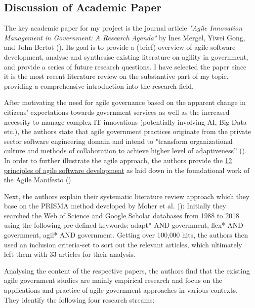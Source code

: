 \documentclass[a4paper]{article}
\begin{document}
\begin{spacing}{1.5}
\subsection*{Discussion of Academic Paper}
The key academic paper for my project is the journal article \textit{"Agile Innovation Management in Government: A Research Agenda"} by Ines Mergel, Yiwei Gong, and John Bertot (\cite*{Mergel2018}). Its goal is to provide a (brief) overview of agile software development, analyse and synthesise existing literature on agility in government, and provide a series of future research questions. I have selected the paper since it is the most recent literature review on the substantive part of my topic, providing a comprehensive introduction into the research field.\par 
After motivating the need for agile governance based on the apparent change in citizens' expectations towards government services as well as the increased necessity to manage complex IT innovations (potentially involving AI, Big Data etc.), the authors state that agile government practices originate from the private sector software engineering domain and intend to "transform organizational culture and methods of collaboration to achieve higher level of adaptiveness” (\cite[p. 292]{Mergel2018}). In order to further illustrate the agile approach, the authors provide the \href{https://agilemanifesto.org/principles.html}{12 principles of agile software development} as laid down in the foundational work of the Agile Manifesto (\cite*{AgileManifesto2001}).\par 
Next, the authors explain their systematic literature review approach which they base on the PRISMA method developed by Moher et al. (\cite*{Moher2009}): Initially they searched the Web of Science and Google Scholar databases from 1988 to 2018 using the following pre-defined keywords: adapt* AND government, flex* AND government, agil* AND government. Getting over 100,000 hits, the authors then used an inclusion criteria-set to sort out the relevant articles, which ultimately left them with 33 articles for their analysis.\par 
Analysing the content of the respective papers, the authors find that the existing agile government studies are mainly empirical research and focus on the applications and practice of agile government approaches in various contexts. They identify the following four research streams:\par %

\end{spacing}
\end{document}
